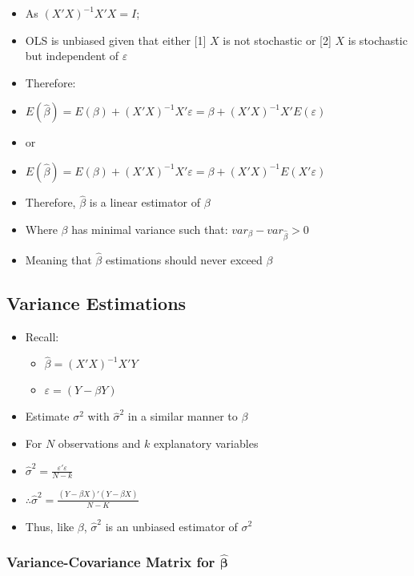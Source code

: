 \documentclass[11pt, english]{article}
\begin{document}
	\begin{itemize}
	\setlength\itemsep{0cm}
		\item As $(X'X)^{-1}X'X=I$;
		\item OLS is unbiased given that either [1] $X$ is not stochastic or [2] $X$ is stochastic but independent of $\varepsilon$
		\item Therefore:
		\item $E(\hat{\beta})=E(\beta)+(X'X)^{-1}X'\varepsilon=\beta+(X'X)^{-1}X'E(\varepsilon)$
		\item[] or
		\item $E(\hat{\beta})=E(\beta)+(X'X)^{-1}X'\varepsilon=\beta+(X'X)^{-1}E(X'\varepsilon)$
		\item Therefore, $\hat{\beta}$ is a linear estimator of $\beta$
		\item Where $\beta$ has minimal variance such that: $var_{\beta}-var_{\hat{\beta}}>0$
		\item Meaning that $\hat{\beta}$ estimations should never exceed $\beta$
	\end{itemize}

	\newpage

	\subsection{Variance Estimations}

	\begin{itemize}
	\setlength\itemsep{0cm}
		\item Recall:
		\begin{itemize}
			\item $\hat{\beta}=(X'X)^{-1}X'Y$
			\item $\varepsilon=(Y-\beta Y)$
		\end{itemize}
		\item Estimate $\sigma^2$ with $\hat{\sigma}^2$ in a similar manner to $\beta$
		\item For $N$ observations and $k$ explanatory variables
		\item $\hat{\sigma}^2=\frac{\varepsilon'\varepsilon}{N-k}$
		\item $\therefore\hat{\sigma}^2=\frac{(Y-\beta X)'(Y-\beta X)}{N-K}$
		\item Thus, like $\beta$, $\hat{\sigma}^2$ is an unbiased estimator of $\sigma^2$
	\end{itemize}

		\subsubsection{Variance-Covariance Matrix for $\mathbf{\hat{\beta}}$}
	
\end{document}
